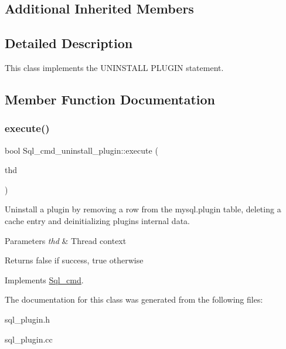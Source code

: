 \subsection*{Additional Inherited Members}


\subsection{Detailed Description}
This class implements the U\+N\+I\+N\+S\+T\+A\+LL P\+L\+U\+G\+IN statement. 

\subsection{Member Function Documentation}
\mbox{\label{classSql__cmd__uninstall__plugin_ad5aad6804dee065f60f1a57d01ced199}} 
\subsubsection{\texorpdfstring{execute()}{execute()}}
{\footnotesize\ttfamily bool Sql\+\_\+cmd\+\_\+uninstall\+\_\+plugin\+::execute (\begin{DoxyParamCaption}\item[{T\+HD $\ast$}]{thd }\end{DoxyParamCaption})\hspace{0.3cm}{\ttfamily [virtual]}}

Uninstall a plugin by removing a row from the mysql.\+plugin table, deleting a cache entry and deinitializing plugin\textquotesingle{}s internal data.


\begin{DoxyParams}{Parameters}
{\em thd} & Thread context\\
\hline
\end{DoxyParams}
\begin{DoxyReturn}{Returns}
false if success, true otherwise 
\end{DoxyReturn}


Implements \mbox{\hyperlink{classSql__cmd_a213367b79b551296fbb7790f2a3732fb}{Sql\+\_\+cmd}}.



The documentation for this class was generated from the following files\+:\begin{DoxyCompactItemize}
\item 
sql\+\_\+plugin.\+h\item 
sql\+\_\+plugin.\+cc\end{DoxyCompactItemize}
